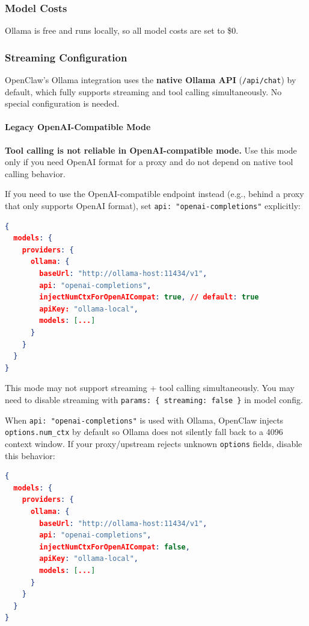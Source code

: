 \subsubsection{Model Costs}


Ollama is free and runs locally, so all model costs are set to \$0.

\subsubsection{Streaming Configuration}


OpenClaw's Ollama integration uses the \textbf{native Ollama API} (\texttt{/api/chat}) by default, which fully supports streaming and tool calling simultaneously. No special configuration is needed.

\paragraph{Legacy OpenAI-Compatible Mode}


\textbf{Tool calling is not reliable in OpenAI-compatible mode.} Use this mode only if you need OpenAI format for a proxy and do not depend on native tool calling behavior.

If you need to use the OpenAI-compatible endpoint instead (e.g., behind a proxy that only supports OpenAI format), set \texttt{api: "openai-completions"} explicitly:

\begin{lstlisting}[language=json]
{
  models: {
    providers: {
      ollama: {
        baseUrl: "http://ollama-host:11434/v1",
        api: "openai-completions",
        injectNumCtxForOpenAICompat: true, // default: true
        apiKey: "ollama-local",
        models: [...]
      }
    }
  }
}
\end{lstlisting}


This mode may not support streaming + tool calling simultaneously. You may need to disable streaming with \texttt{params: \{ streaming: false \}} in model config.

When \texttt{api: "openai-completions"} is used with Ollama, OpenClaw injects \texttt{options.num\_ctx} by default so Ollama does not silently fall back to a 4096 context window. If your proxy/upstream rejects unknown \texttt{options} fields, disable this behavior:

\begin{lstlisting}[language=json]
{
  models: {
    providers: {
      ollama: {
        baseUrl: "http://ollama-host:11434/v1",
        api: "openai-completions",
        injectNumCtxForOpenAICompat: false,
        apiKey: "ollama-local",
        models: [...]
      }
    }
  }
}
\end{lstlisting}


